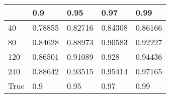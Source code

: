 \begin{tabular}{lllll}
& 0.9 & 0.95 & 0.97 & 0.99 \\ 
\hline 
40 & 0.78855 & 0.82716 & 0.84308 & 0.86166 \\ 
80 & 0.84628 & 0.88973 & 0.90583 & 0.92227 \\ 
120 & 0.86501 & 0.91089 & 0.928 & 0.94436 \\ 
240 & 0.88642 & 0.93515 & 0.95414 & 0.97165 \\ 
True & 0.9 & 0.95 & 0.97 & 0.99 \\ 
\hline 
\end{tabular}